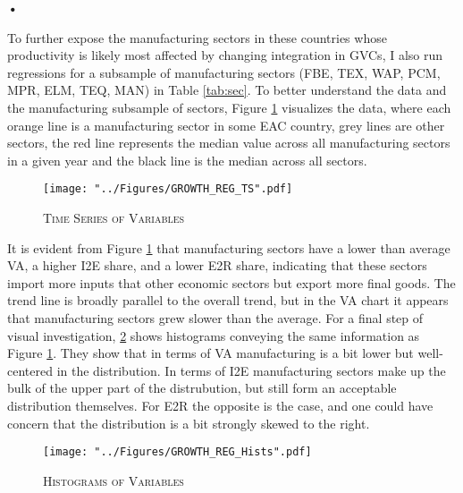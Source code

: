 \textbf{\textbf{•}}\documentclass[a4paper]{article}
\begin{document}
To further expose the manufacturing sectors in these countries whose productivity is likely most affected by changing integration in GVCs, I also run regressions for a subsample of manufacturing sectors (FBE, TEX, WAP, PCM, MPR, ELM, TEQ, MAN) in Table \ref{tab:sec}. To better understand the data and the manufacturing subsample of sectors, Figure \ref{fig:GROWTH_REG_TS} visualizes the data, where each orange line is a manufacturing sector in some EAC country, grey lines are other sectors, the red line represents the median value across all manufacturing sectors in a given year and the black line is the median across all sectors.  


\begin{figure}[h!]
\centering
\caption{\label{fig:GROWTH_REG_TS}\textsc{Time Series of Variables}}
\texttt{[image: "../Figures/GROWTH\_REG\_TS".pdf]} %
\end{figure}
\FloatBarrier

It is evident from Figure \ref{fig:GROWTH_REG_TS} that manufacturing sectors have a lower than average VA, a higher I2E share, and a lower E2R share, indicating that these sectors import more inputs that other economic sectors but export more final goods. The trend line is broadly parallel to the overall trend, but in the VA chart it appears that manufacturing sectors grew slower than the average. For a final step of visual investigation, \ref{fig:GROWTH_REG_Hists} shows histograms conveying the same information as Figure \ref{fig:GROWTH_REG_TS}. They show that in terms of VA manufacturing is a bit lower but well-centered in the distribution. In terms of I2E manufacturing sectors make up the bulk of the upper part of the distrubution, but still form an acceptable distribution themselves. For E2R the opposite is the case, and one could have concern that the distribution is a bit strongly skewed to the right. 

\begin{figure}[h!]
\centering
\caption{\label{fig:GROWTH_REG_Hists}\textsc{Histograms of Variables}}
\texttt{[image: "../Figures/GROWTH\_REG\_Hists".pdf]} %
\end{figure}
\FloatBarrier
\end{document}

